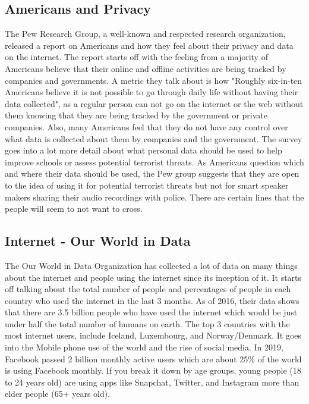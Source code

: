 \documentclass[10.5pt, twoside,twocolumn]{article}
\begin{document}
\subsection{Americans and Privacy}
The Pew Research Group, a well-known and respected research organization, released a report on Americans and how they feel about their privacy and data on the internet. The report starts off with the feeling from a majority of Americans believe that their online and offline activities are being tracked by companies and governments. A metric they talk about is how "Roughly six-in-ten Americans believe it is not possible to go through daily life without having their data collected", as a regular person can not go on the internet or the web without them knowing that they are being tracked by the government or private companies. Also, many Americans feel that they do not have any control over what data is collected about them by companies and the government. The survey goes into a lot more detail about what personal data should be used to help improve schools or assess potential terrorist threats. As Americans question which and where their data should be used, the Pew group suggests that they are open to the idea of using it for potential terrorist threats but not for smart speaker makers sharing their audio recordings with police. There are certain lines that the people will seem to not want to cross. 

\subsection{Internet - Our World in Data}
The Our World in Data Organization has collected a lot of data on many things about the internet and people using the internet since its inception of it. It starts off talking about the total number of people and percentages of people in each country who used the internet in the last 3 months. As of 2016, their data shows that there are 3.5 billion people who have used the internet which would be just under half the total number of humans on earth. The top 3 countries with the most internet users, include Iceland, Luxembourg, and Norway/Denmark. It goes into the Mobile phone use of the world and the rise of social media. In 2019, Facebook passed 2 billion monthly active users which are about 25\% of the world is using Facebook monthly. If you break it down by age groups, young people (18 to 24 years old) are using apps like Snapchat, Twitter, and Instagram more than elder people (65+ years old).
\end{document}
